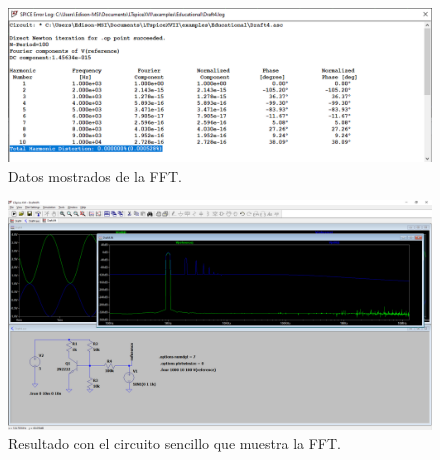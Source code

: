 \documentclass[a4paper]{article} %
\begin{document}
\begin{figure} %
	\centering %
	\includegraphics[scale=0.4]{IMAGENES/img23} %
	\caption{Datos mostrados de la FFT.} %
	\label{img23} %
\end{figure} %

\begin{figure} %
	\centering %
	\includegraphics[scale=0.3]{IMAGENES/img24} %
	\caption{Resultado con el circuito sencillo que muestra la FFT.} %
	\label{img24} %
\end{figure}
\end{document}
